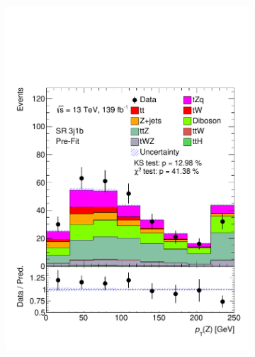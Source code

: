 \begin{figure}[!h] 
\vspace*{0.4cm}
  \begin{subfigure}[b]{0.33\linewidth}
    \centering
    \includegraphics[width=\linewidth]{ubonn-thesis/Chapters/Chapters_06/Figure/Input_distribution/SR_3j1b_Z_pt.pdf} 
  \end{subfigure} 
  \begin{subfigure}[b]{0.33\linewidth}
    \centering

\end{subfigure}
\end{figure}
